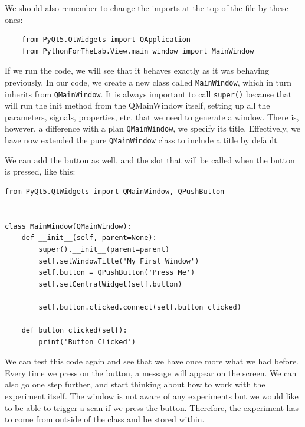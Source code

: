 We should also remember to change the imports at the top of the file by these ones:

\begin{verbatim}
    from PyQt5.QtWidgets import QApplication
    from PythonForTheLab.View.main_window import MainWindow
\end{verbatim}

If we run the code, we will see that it behaves exactly as it was behaving previously. In our code, we create a new class called \texttt{MainWindow}, which in turn inherits from \texttt{QMainWindow}. It is always important to call \texttt{super()} because that will run the init method from the QMainWindow itself, setting up all the parameters, signals, properties, etc. that we need to generate a window. There is, however, a difference with a plan \texttt{QMainWindow}, we specify its title. Effectively, we have now extended the pure \texttt{QMainWindow} class to include a title by default.


We can add the button as well, and the slot that will be called when the button is pressed, like this:

\begin{verbatim}
from PyQt5.QtWidgets import QMainWindow, QPushButton


class MainWindow(QMainWindow):
    def __init__(self, parent=None):
        super().__init__(parent=parent)
        self.setWindowTitle('My First Window')
        self.button = QPushButton('Press Me')
        self.setCentralWidget(self.button)

        self.button.clicked.connect(self.button_clicked)

    def button_clicked(self):
        print('Button Clicked')
\end{verbatim}

We can test this code again and see that we have once more what we had before. Every time we press on the button, a message will appear on the screen. We can also go one step further, and start thinking about how to work with the experiment itself. The window is not aware of any experiments but we would like to be able to trigger a scan if we press the button. Therefore, the experiment has to come from outside of the class and be stored within.

